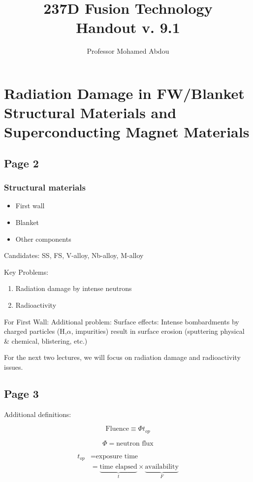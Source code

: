 \documentclass[11pt]{report} %
\title{237D Fusion Technology \\
Handout v. 9.1}
\author{Professor Mohamed Abdou}
\begin{document}
\maketitle
\chapter{Radiation Damage in FW/Blanket Structural Materials and Superconducting Magnet Materials}

\section{Page 2}
\subsection{Structural materials}
\begin{itemize}
\item First wall
\item Blanket
\item Other components
\end{itemize}
Candidates: SS, FS, V-alloy, Nb-alloy, M-alloy

Key Problems:
\begin{enumerate}
\item Radiation damage by intense neutrons
\item Radioactivity
\end{enumerate}

For First Wall:
Additional problem:
Surface effects: Intense bombardments by charged particles (H,$\alpha$, impurities) result in surface erosion (sputtering physical \& chemical, blistering, etc.)

For the next two lectures, we will focus on radiation damage and radioactivity issues.

\section{Page 3}
Additional definitions:

\begin{equation}
	\text{Fluence} \equiv \Phi t_{op}
\end{equation}

\begin{equation}
  \Phi = \text{neutron flux}
\end{equation}

\begin{align}
  t_{op} & = \text{exposure time} \\
         & = \underbrace{\text{time elapsed}}_{t} \times \underbrace{\text{availability}}_{F}
\end{align}
\end{document}
